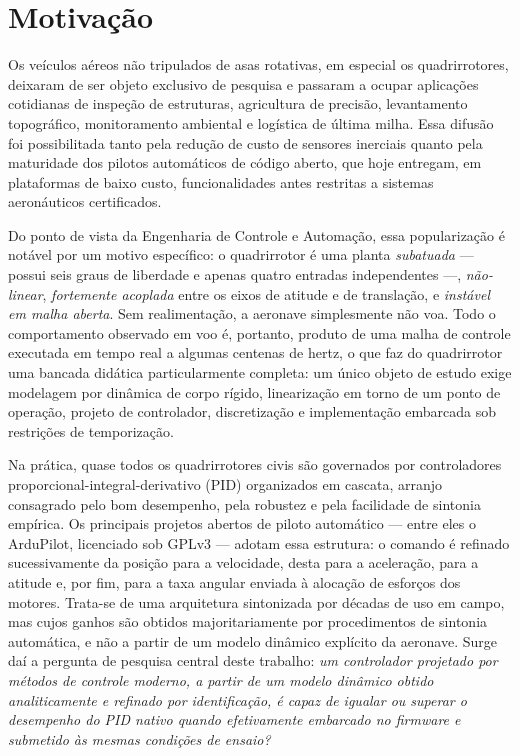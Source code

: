 \documentclass[12pt,a4paper]{article}
\begin{document}
\section{Motivação}

Os veículos aéreos não tripulados de asas rotativas, em especial os
quadrirrotores, deixaram de ser objeto exclusivo de pesquisa e passaram a ocupar
aplicações cotidianas de inspeção de estruturas, agricultura de precisão,
levantamento topográfico, monitoramento ambiental e logística de última milha. Essa
difusão foi possibilitada tanto pela redução de custo de sensores inerciais quanto
pela maturidade dos pilotos automáticos de código aberto, que hoje entregam, em
plataformas de baixo custo, funcionalidades antes restritas a sistemas
aeronáuticos certificados.

Do ponto de vista da Engenharia de Controle e Automação, essa popularização é
notável por um motivo específico: o quadrirrotor é uma planta \emph{subatuada} ---
possui seis graus de liberdade e apenas quatro entradas independentes ---,
\emph{não-linear}, \emph{fortemente acoplada} entre os eixos de atitude e de
translação, e \emph{instável em malha aberta}. Sem realimentação, a aeronave
simplesmente não voa. Todo o comportamento observado em voo é, portanto, produto de
uma malha de controle executada em tempo real a algumas centenas de hertz, o que faz
do quadrirrotor uma bancada didática particularmente completa: um único objeto de
estudo exige modelagem por dinâmica de corpo rígido, linearização em torno de um
ponto de operação, projeto de controlador, discretização e implementação embarcada
sob restrições de temporização.

Na prática, quase todos os quadrirrotores civis são governados por controladores
proporcional-integral-derivativo (PID) organizados em cascata, arranjo consagrado
pelo bom desempenho, pela robustez e pela facilidade de sintonia empírica. Os
principais projetos abertos de piloto automático --- entre eles o ArduPilot,
licenciado sob GPLv3 --- adotam essa estrutura: o comando é refinado sucessivamente
da posição para a velocidade, desta para a aceleração, para a atitude e, por fim,
para a taxa angular enviada à alocação de esforços dos motores. Trata-se de uma
arquitetura sintonizada por décadas de uso em campo, mas cujos ganhos são obtidos
majoritariamente por procedimentos de sintonia automática, e não a partir de um
modelo dinâmico explícito da aeronave. Surge daí a pergunta de pesquisa central
deste trabalho: \emph{um controlador projetado por métodos de controle moderno, a
partir de um modelo dinâmico obtido analiticamente e refinado por identificação, é
capaz de igualar ou superar o desempenho do PID nativo quando efetivamente embarcado
no firmware e submetido às mesmas condições de ensaio?}
\end{document}
